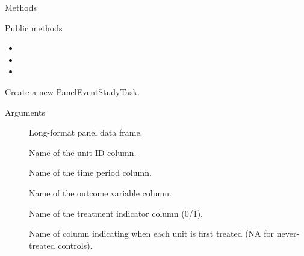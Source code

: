 \documentclass[a4paper]{book}
\begin{document}
\begin{Section}{Methods}
%
\begin{SubSection}{Public methods}
\begin{itemize}

\item{} 
\item{} 
\item{} 

\end{itemize}

\end{SubSection}



\hypertarget{method-PanelEventStudyTask-initialize}{}
%
\begin{SubSection}{}
Create a new PanelEventStudyTask.
%

%
\begin{SubSubSection}{Arguments}

\begin{description}

\item[] Long-format panel data frame.
\item[] Name of the unit ID column.
\item[] Name of the time period column.
\item[] Name of the outcome variable column.
\item[] Name of the treatment indicator column (0/1).
\item[] Name of column indicating when each unit is
first treated (NA for never-treated controls).

\end{description}




\end{SubSubSection}
\end{SubSection}
\end{Section}
\end{document}
